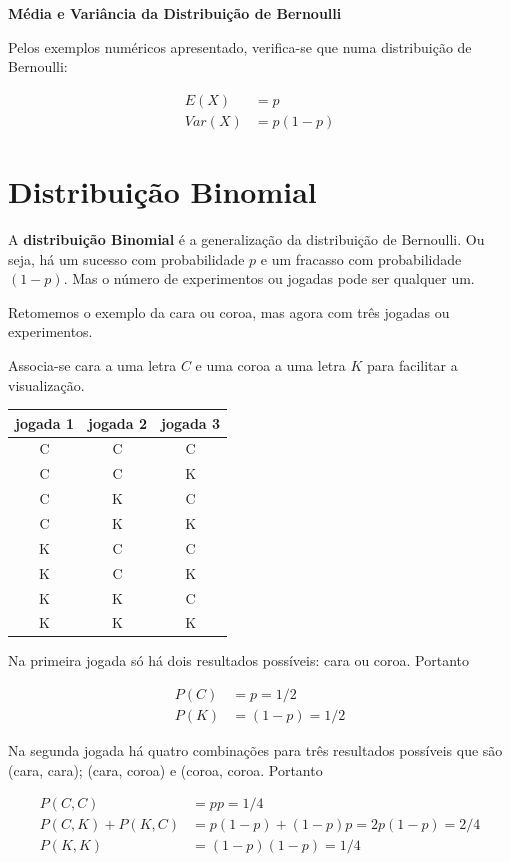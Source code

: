 \documentclass[
]{book}
\begin{document}
\textbf{Média e Variância da Distribuição de Bernoulli}

Pelos exemplos numéricos apresentado, verifica-se que numa distribuição de Bernoulli:

\begin{align}
  E(X) &= p \\
  Var(X) &= p(1-p)
\end{align}

\hypertarget{distribuiuxe7uxe3o-binomial}{%
\section{Distribuição Binomial}\label{distribuiuxe7uxe3o-binomial}}

A \textbf{distribuição Binomial} é a generalização da distribuição de Bernoulli. Ou seja,
há um sucesso com probabilidade \(p\) e um fracasso com probabilidade \((1-p)\). Mas o número de experimentos ou jogadas pode ser qualquer um.

Retomemos o exemplo da cara ou coroa, mas agora com três jogadas ou experimentos.

Associa-se cara a uma letra \(C\) e uma coroa a uma letra \(K\) para facilitar a
visualização.

\begin{longtable}[]{@{}ccc@{}}
\toprule
jogada 1 & jogada 2 & jogada 3 \\
\midrule
\endhead
C & C & C \\
C & C & K \\
C & K & C \\
C & K & K \\
K & C & C \\
K & C & K \\
K & K & C \\
K & K & K \\
\bottomrule
\end{longtable}

Na primeira jogada só há dois resultados possíveis: cara ou coroa. Portanto

\begin{align*}
  P(C) &= p = 1/2 \\
  P(K) &= (1-p) = 1/2
\end{align*}

Na segunda jogada há quatro combinações para três resultados possíveis que são (cara, cara); (cara, coroa) e (coroa, coroa. Portanto

\begin{align*}
  P(C,C) &= pp = 1/4 \\
  P(C,K) + P(K,C) &= p(1-p) + (1-p)p = 2p(1-p) = 2/4\\
  P(K,K) &= (1-p)(1-p) = 1/4
\end{align*}
\end{document}
